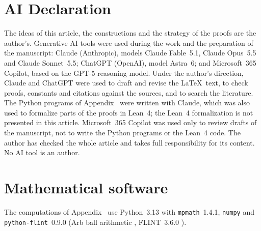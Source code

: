 \section*{AI Declaration}
The ideas of this article, the constructions and the strategy of the proofs are the author's. Generative AI tools were used during the work and the preparation of the manuscript: Claude (Anthropic), models Claude Fable~5.1, Claude Opus~5.5 and Claude Sonnet~5.5; ChatGPT (OpenAI), model Astra~6; and Microsoft~365 Copilot, based on the GPT-5 reasoning model. Under the author's direction, Claude and ChatGPT were used to draft and revise the \LaTeX\ text, to check proofs, constants and citations against the sources, and to search the literature. The Python programs of Appendix~ were written with Claude, which was also used to formalize parts of the proofs in Lean~4; the Lean~4 formalization is not presented in this article. Microsoft~365 Copilot was used only to review drafts of the manuscript, not to write the Python programs or the Lean~4 code. The author has checked the whole article and takes full responsibility for its content. No AI tool is an author.

\section*{Mathematical software}
The computations of Appendix~ use Python~3.13 with \texttt{mpmath}~1.4.1, \texttt{numpy} and \texttt{python-flint}~0.9.0 (Arb ball arithmetic , FLINT~3.6.0 ).

